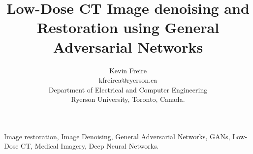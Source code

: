 \documentclass[journal]{IEEEtran}
\begin{document}
\title{Low-Dose CT Image denoising and Restoration using General Adversarial Networks}

\author{Kevin Freire\\
kfreirea@ryerson.ca\\
Department of Electrical and Computer Engineering\\
Ryerson University, Toronto, Canada.}
\maketitle


\begin{abstract}



\end{abstract}

\begin{IEEEkeywords}
Image restoration, Image Denoising, General Adversarial Networks, GANs, Low-Dose CT, Medical Imagery, Deep Neural Networks.
\end{IEEEkeywords}

\end{document}
